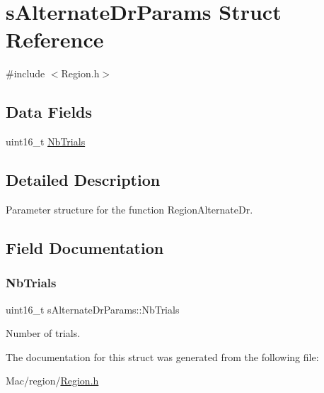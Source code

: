 \hypertarget{structsAlternateDrParams}{}\section{s\+Alternate\+Dr\+Params Struct Reference}
\label{structsAlternateDrParams}


{\ttfamily \#include $<$Region.\+h$>$}

\subsection*{Data Fields}
\begin{DoxyCompactItemize}
\item 
uint16\+\_\+t \hyperlink{structsAlternateDrParams_adb2fd6b829d99cfbba548612e85d01bd}{Nb\+Trials}
\end{DoxyCompactItemize}


\subsection{Detailed Description}
Parameter structure for the function Region\+Alternate\+Dr. 

\subsection{Field Documentation}
\mbox{\label{structsAlternateDrParams_adb2fd6b829d99cfbba548612e85d01bd}} 
\subsubsection{\texorpdfstring{Nb\+Trials}{NbTrials}}
{\footnotesize\ttfamily uint16\+\_\+t s\+Alternate\+Dr\+Params\+::\+Nb\+Trials}

Number of trials. 

The documentation for this struct was generated from the following file\+:\begin{DoxyCompactItemize}
\item 
Mac/region/\hyperlink{Region_8h}{Region.\+h}\end{DoxyCompactItemize}
